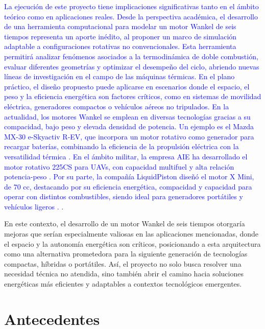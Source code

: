 \documentclass{LS}
\begin{document}
\textcolor{blue}{La ejecución de este proyecto tiene implicaciones significativas tanto en el ámbito teórico como en aplicaciones reales. Desde la perspectiva académica, el desarrollo de una herramienta computacional para modelar un motor Wankel de seis tiempos representa un aporte inédito, al proponer un marco de simulación adaptable a configuraciones rotativas no convencionales. Esta herramienta permitirá analizar fenómenos asociados a la termodinámica de doble combustión, evaluar diferentes geometrías y optimizar el desempeño del ciclo, abriendo nuevas líneas de investigación en el campo de las máquinas térmicas. En el plano práctico, el diseño propuesto puede aplicarse en escenarios donde el espacio, el peso y la eficiencia energética son factores críticos, como en sistemas de movilidad eléctrica, generadores compactos o vehículos aéreos no tripulados. En la actualidad, los motores Wankel se emplean en diversas tecnologías gracias a su compacidad, bajo peso y elevada densidad de potencia. Un ejemplo es el Mazda MX-30 e-Skyactiv R-EV, que incorpora un motor rotativo como generador para recargar baterías, combinando la eficiencia de la propulsión eléctrica con la versatilidad térmica \cite{mazda2023}. En el ámbito militar, la empresa AIE ha desarrollado el motor rotativo 225CS para UAVs, con capacidad multifuel y alta relación potencia-peso \cite{aie2024}. Por su parte, la compañía LiquidPiston diseñó el motor X Mini, de 70 cc, destacando por su eficiencia energética, compacidad y capacidad para operar con distintos combustibles, siendo ideal para generadores portátiles y vehículos ligeros \cite{liquidpiston2024}.
}.


En este contexto, el desarrollo de un motor Wankel de seis tiempos otorgaría mejoras que serían especialmente valiosas en las aplicaciones mencionadas, donde el espacio y la autonomía energética son críticos, posicionando a esta arquitectura como una alternativa prometedora para la siguiente generación de tecnologías compactas, híbridas o portátiles. Así, el proyecto no solo busca resolver una necesidad técnica no atendida, sino también abrir el camino hacia soluciones energéticas más  eficientes y adaptables a contextos tecnológicos emergentes.



\section{\bfseries\fontsize{10}{12}\selectfont Antecedentes} \label{sec:intro} 
\end{document}
